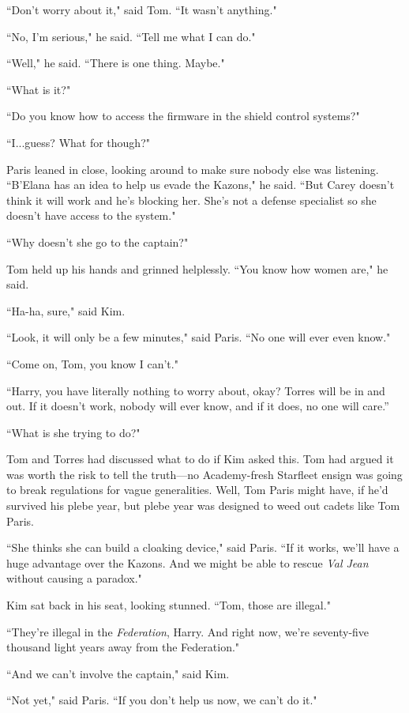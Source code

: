 \documentclass[twoside,letterpaper,12pt]{memoir}
\begin{document}
``Don't worry about it," said Tom. ``It wasn't anything." 

``No, I'm serious," he said. ``Tell me what I can do." 

``Well," he said. ``There is one thing. Maybe." 

``What is it?" 

``Do you know how to access the firmware in the shield control systems?" 

``I...guess? What for though?" 

Paris leaned in close, looking around to make sure nobody else was listening. ``B'Elana has an idea to help us evade the Kazons," he said. ``But Carey doesn't think it will work and he's blocking her. She's not a defense specialist so she doesn't have access to the system." 

``Why doesn't she go to the captain?" 

Tom held up his hands and grinned helplessly. ``You know how women are," he said. 

``Ha-ha, sure," said Kim. 

``Look, it will only be a few minutes," said Paris. ``No one will ever even know." 

``Come on, Tom, you know I can't." 

``Harry, you have literally nothing to worry about, okay? Torres will be in and out. If it doesn't work, nobody will ever know, and if it does, no one will care.” 

``What is she trying to do?" 

Tom and Torres had discussed what to do if Kim asked this. Tom had argued it was worth the risk to tell the truth---no Academy-fresh Starfleet ensign was going to break regulations for vague generalities. Well, Tom Paris might have, if he'd survived his plebe year, but plebe year was designed to weed out cadets like Tom Paris. 

``She thinks she can build a cloaking device," said Paris. ``If it works, we'll have a huge advantage over the Kazons. And we might be able to rescue \textit{Val Jean} without causing a paradox." 

Kim sat back in his seat, looking stunned. ``Tom, those are illegal." 

``They're illegal in the \textit{Federation}, Harry. And right now, we're seventy-five thousand light years away from the Federation." 

``And we can't involve the captain," said Kim. 

``Not yet," said Paris. ``If you don't help us now, we can't do it." 
\end{document}

